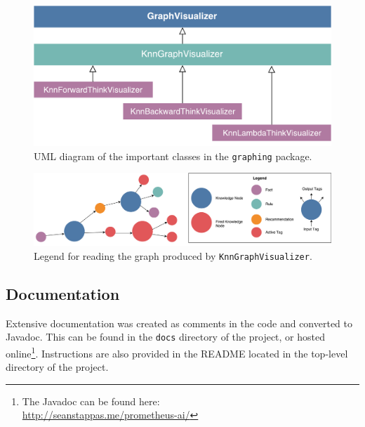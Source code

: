 \documentclass[titlepage,11pt]{article}
\newcommand{\code}[1]{\texttt{#1}}
\begin{document}
\begin{figure}[!htb]
	\includegraphics[width=\columnwidth]{figures/uml_graphing.pdf}
	\caption{UML diagram of the important classes in the \code{graphing} package.}
	\label{fig:uml_graphing}
\end{figure}

\begin{figure}[!htb]
	\includegraphics[width=\textwidth]{figures/knn_graph_legend.pdf}
	\caption{Legend for reading the graph produced by \code{KnnGraphVisualizer}.}
	\label{fig:knn_graph_legend}
\end{figure}

\subsection{Documentation}
Extensive documentation was created as comments in the code and converted to Javadoc. This can be found in the \code{docs} directory of the project, or hosted online\footnote{The Javadoc can be found here:\\ \url{http://seanstappas.me/prometheus-ai/}}. Instructions are also provided in the README located in the top-level directory of the project.
\end{document}
